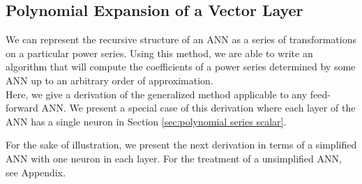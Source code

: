 
\subsection{Polynomial Expansion of a Vector Layer}
\label{sec:polynomial series vector}

We can represent the recursive structure of an ANN as a series of transformations on a particular power series. Using this method, we are able to write an algorithm that will compute the coefficients of a power series determined by some ANN up to an arbitrary order of approximation.\\

Here, we give a derivation of the generalized method applicable to any feed-forward ANN.
We present a special case of this derivation where each layer of the ANN has a single neuron in Section \ref{sec:polynomial series scalar}.

{\color{red} For the sake of illustration, we present the next derivation in terms of a simplified ANN with one neuron in each layer. For the treatment of a unsimplified ANN, see Appendix.}

